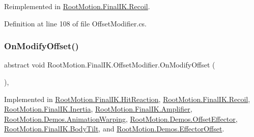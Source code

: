 Reimplemented in \mbox{\hyperlink{class_root_motion_1_1_final_i_k_1_1_recoil_a3835ead88696a858c864e7884b269478}{Root\+Motion.\+Final\+I\+K.\+Recoil}}.



Definition at line 108 of file Offset\+Modifier.\+cs.

\mbox{\label{class_root_motion_1_1_final_i_k_1_1_offset_modifier_a777e9ffb4afca3d8647959a79a1120bb}} 
\subsubsection{\texorpdfstring{On\+Modify\+Offset()}{OnModifyOffset()}}
{\footnotesize\ttfamily abstract void Root\+Motion.\+Final\+I\+K.\+Offset\+Modifier.\+On\+Modify\+Offset (\begin{DoxyParamCaption}{ }\end{DoxyParamCaption})\hspace{0.3cm}{\ttfamily [protected]}, {}}



Implemented in \mbox{\hyperlink{class_root_motion_1_1_final_i_k_1_1_hit_reaction_a46076fa7f2140df3df13553cb32b27d8}{Root\+Motion.\+Final\+I\+K.\+Hit\+Reaction}}, \mbox{\hyperlink{class_root_motion_1_1_final_i_k_1_1_recoil_ab90e5603561322c91818665cc301d38a}{Root\+Motion.\+Final\+I\+K.\+Recoil}}, \mbox{\hyperlink{class_root_motion_1_1_final_i_k_1_1_inertia_a98c184eccf6d8b46f5705f0611263b3e}{Root\+Motion.\+Final\+I\+K.\+Inertia}}, \mbox{\hyperlink{class_root_motion_1_1_final_i_k_1_1_amplifier_ae715d956bcc0f79218cef49659e6f2fb}{Root\+Motion.\+Final\+I\+K.\+Amplifier}}, \mbox{\hyperlink{class_root_motion_1_1_demos_1_1_animation_warping_adae5cbd4af0d90ea0084eb5c0c689dc7}{Root\+Motion.\+Demos.\+Animation\+Warping}}, \mbox{\hyperlink{class_root_motion_1_1_demos_1_1_offset_effector_ac832df1522c8056a353e3506ef3348dc}{Root\+Motion.\+Demos.\+Offset\+Effector}}, \mbox{\hyperlink{class_root_motion_1_1_final_i_k_1_1_body_tilt_a5a68b6792b8b58c5a5aa24ace1569526}{Root\+Motion.\+Final\+I\+K.\+Body\+Tilt}}, and \mbox{\hyperlink{class_root_motion_1_1_demos_1_1_effector_offset_afa21e7814f61b1bb693cf27a076eab4c}{Root\+Motion.\+Demos.\+Effector\+Offset}}.


